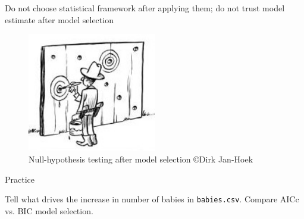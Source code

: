 \documentclass[12pt]{beamer}\usepackage[]{graphicx}\usepackage[]{color}
\begin{document}
\begin{frame}{Do not choose statistical framework after applying them; do not trust model estimate after model selection}
\begin{figure}
\includegraphics[width=0.5\textwidth]{Figures/dirk-jan-hoek}
\caption{Null-hypothesis testing after model selection \copyright Dirk Jan-Hoek}
\end{figure}
\end{frame}

\begin{frame}{Practice}

Tell what drives the increase in number of babies in \texttt{babies.csv}. Compare AICc vs. BIC model selection. 


\end{frame}
\end{document}
